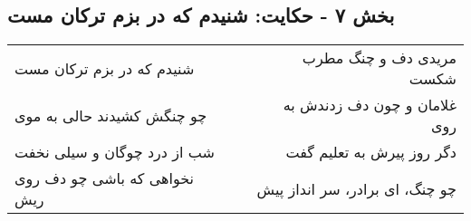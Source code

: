 \begin{center}
\section*{بخش ۷ - حکایت: شنیدم که در بزم ترکان مست}
\label{sec:007}
\begin{longtable}{l p{0.5cm} r}
شنیدم که در بزم ترکان مست
&&
مریدی دف و چنگ مطرب شکست
\\
چو چنگش کشیدند حالی به موی
&&
غلامان و چون دف زدندش به روی
\\
شب از درد چوگان و سیلی نخفت
&&
دگر روز پیرش به تعلیم گفت
\\
نخواهی که باشی چو دف روی ریش
&&
چو چنگ، ای برادر، سر انداز پیش
\\
\end{longtable}
\end{center}
